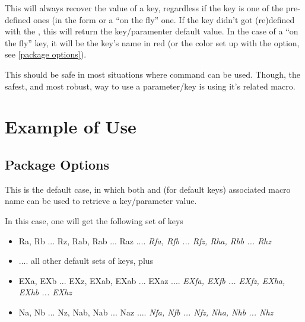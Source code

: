 \documentclass[10pt]{article}
\begin{document}
\begin{codedescribe}{\QuestVal}
\begin{codesyntax}%
\end{codesyntax}
This will always recover the value of a key, regardless if the key is one of the pre-defined ones (in the form  or a ``on the fly'' one.
If the key didn't got (re)defined with the , this will return the key/paramenter default value. In the case of a ``on the fly'' key, it will be the key's name in red (or the color set up with the  option, see \ref{package options}).

This should be safe in most situations where \tsobj{\pgfkeys} command can be used. Though, the safest, and most robust, way to use a parameter/key is using it's related macro.
\end{codedescribe}

\section{Example of Use}

\subsection{Package Options}
\begin{codestore}
\usepackage{tikzquests}
\end{codestore}

This is the default case, in which both \tsobj{\QuestVal} and (for default keys) associated macro name can be used to retrieve a key/parameter value.

\begin{codestore}
\usepackage[xtrakeys={EX,N},xtraidx={f,h},undef color={blue},no defs]{tikzquests}
\end{codestore}


In this case, one will get the following set of keys

\begin{itemize}[nosep]
\item Ra, Rb ... Rz, Rab, Rab ... Raz .... \emph{Rfa, Rfb ... Rfz, Rha, Rhb ... Rhz}
\item .... all other default sets of keys, plus
\item EXa, EXb ... EXz, EXab, EXab ... EXaz .... \emph{EXfa, EXfb ... EXfz, EXha, EXhb ... EXhz}
\item Na, Nb ... Nz, Nab, Nab ... Naz .... \emph{Nfa, Nfb ... Nfz, Nha, Nhb ... Nhz}
\end{itemize}
\end{document}
